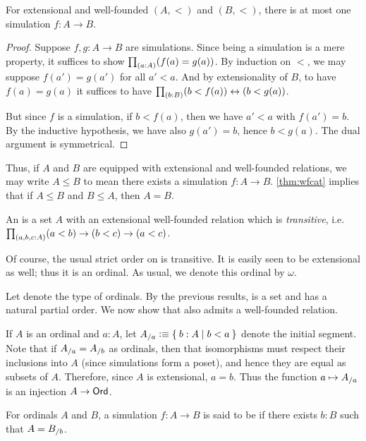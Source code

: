 \begin{lem}
  For extensional and well-founded $(A,<)$ and $(B,<)$, there is at most one simulation $f:A\to B$.
\end{lem}
\begin{proof}
  Suppose $f,g:A\to B$ are simulations.
  Since being a simulation is a mere property, it suffices to show $\prd{a:A}(f(a)=g(a))$.
  By induction on $<$, we may suppose $f(a')=g(a')$ for all $a'<a$.
  And by extensionality of $B$, to have $f(a)=g(a)$ it suffices to have $\prd{b:B}(b<f(a)) \leftrightarrow (b<g(a))$.

  But since $f$ is a simulation, if $b<f(a)$, then we have $a'<a$ with $f(a')=b$.
  By the inductive hypothesis, we have also $g(a')=b$, hence $b<g(a)$.
  The dual argument is symmetrical.
\end{proof}

Thus, if $A$ and $B$ are equipped with extensional and well-founded relations, we may write $A\le B$ to mean there exists a simulation $f:A\to B$.
\autoref{thm:wfcat} implies that if $A\le B$ and $B\le A$, then $A=B$.

\begin{defn}
  An  is a set $A$ with an extensional well-founded relation which is \emph{transitive}, i.e.\ $\prd{a,b,c:A}(a<b)\to (b<c) \to (a<c)$.
\end{defn}

\begin{eg}
  Of course, the usual strict order on \nat is transitive.
  It is easily seen to be extensional as well; thus it is an ordinal.
  As usual, we denote this ordinal by $\omega$.
\end{eg}

Let \ord denote the type of ordinals.
By the previous results, \ord is a set and has a natural partial order.
We now show that \ord also admits a well-founded relation.

If $A$ is an ordinal and $a:A$, let ${A}_{/a} \vcentcolon\equiv \Set{ b:A | b<a}$ denote the initial segment.
Note that if ${A}_{/a} = {A}_{/b}$ as ordinals, then that isomorphisms must respect their inclusions into $A$ (since simulations form a poset), and hence they are equal as subsets of $A$.
Therefore, since $A$ is extensional, $a=b$.
Thus the function $a\mapsto {A}_{/a}$ is an injection $A\to \mathsf{Ord}$.

\begin{defn}
  For ordinals $A$ and $B$, a simulation $f:A\to B$ is said to be  if there exists $b:B$ such that $A = {B}_{/b}$.
\end{defn}

